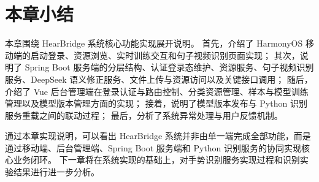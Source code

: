 
\section{本章小结}

本章围绕 HearBridge 系统核心功能实现展开说明。
首先，介绍了 HarmonyOS 移动端的启动登录、资源浏览、实时训练交互和句子视频识别页面实现；
其次，说明了 Spring Boot 服务端的分层结构、认证登录态维护、资源服务、句子视频识别服务、DeepSeek 语义修正服务、文件上传与资源访问以及关键接口调用；
随后，介绍了 Vue 后台管理端在登录认证与路由控制、分类资源管理、样本与模型训练管理以及模型版本管理方面的实现；
接着，说明了模型版本发布与 Python 识别服务重载之间的联动过程；
最后，分析了系统异常处理与用户反馈机制。

通过本章实现说明，可以看出 HearBridge 系统并非由单一端完成全部功能，而是通过移动端、后台管理端、Spring Boot 服务端和 Python 识别服务的协同实现核心业务闭环。
下一章将在系统实现的基础上，对手势识别服务实现过程和识别实验结果进行进一步分析。
